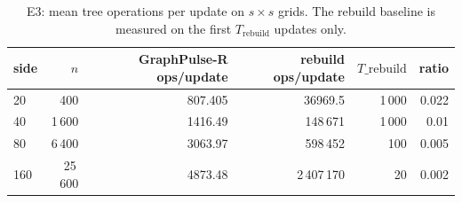 \begin{table}[t]
\centering
\caption{E3: mean tree operations per update on $s\times s$ grids. The rebuild baseline is measured on the first $T_{\mathrm{rebuild}}$ updates only.}
\label{tab:e3}
\small
\begin{tabular}{lrrrrr}
\hline
side & $n$ & GraphPulse-R ops/update & rebuild ops/update & $T\_{\mathrm{rebuild}}$ & ratio \\
\hline
20 & 400 & 807.405 & 36969.5 & 1\,000 & 0.022 \\
40 & 1\,600 & 1416.49 & 148\,671 & 1\,000 & 0.01 \\
80 & 6\,400 & 3063.97 & 598\,452 & 100 & 0.005 \\
160 & 25\,600 & 4873.48 & 2\,407\,170 & 20 & 0.002 \\
\hline
\end{tabular}
\end{table}
